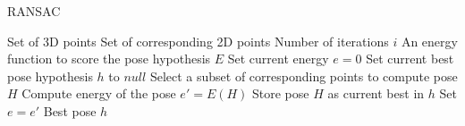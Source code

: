 \begin{algorithm}
\caption{RANSAC} \label{algorithm:ransac}
\begin{algorithmic} 
\REQUIRE Set of 3D points
\REQUIRE Set of corresponding 2D points
\REQUIRE Number of iterations $i$
\REQUIRE An energy function to score the pose hypothesis $E$
\STATE Set current energy $e=0$
\STATE Set current best pose hypothesis $h$ to $null$
\STATE Select a subset of corresponding points to compute pose $H$
\STATE Compute energy of the pose $e'=E(H)$
\STATE Store pose $H$ as current best in $h$
\STATE Set $e = e'$
\ENDIF
\ENDFOR
\RETURN Best pose $h$
\end{algorithmic}
\end{algorithm}